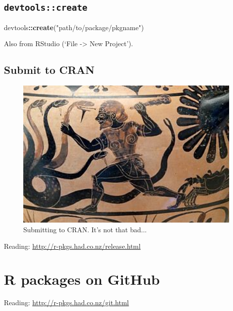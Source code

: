 \documentclass[]{book}
\newenvironment{Shaded}{\begin{snugshade}}{\end{snugshade}}
\newcommand{\KeywordTok}[1]{\textcolor[rgb]{0.13,0.29,0.53}{\textbf{#1}}}
\newcommand{\StringTok}[1]{\textcolor[rgb]{0.31,0.60,0.02}{#1}}
\newcommand{\OperatorTok}[1]{\textcolor[rgb]{0.81,0.36,0.00}{\textbf{#1}}}
\newcommand{\NormalTok}[1]{#1}
\theoremstyle{definition}
\theoremstyle{definition}
\theoremstyle{definition}
\theoremstyle{remark}
\begin{document}
\subsection{\texorpdfstring{\texttt{devtools::create}}{devtools::create}}\label{devtoolscreate}

\begin{Shaded}
\begin{Highlighting}[]
\NormalTok{devtools}\OperatorTok{::}\KeywordTok{create}\NormalTok{(}\StringTok{"path/to/package/pkgname"}\NormalTok{)}
\end{Highlighting}
\end{Shaded}

Also from RStudio (`File -\textgreater{} New Project').

\subsection{Submit to CRAN}\label{submit-to-cran}

\begin{figure}

{\centering \includegraphics[width=4.44in]{images/ch3_hydra} 

}

\caption{Submitting to CRAN.  It's not that bad...}\label{fig:hydra}
\end{figure}

Reading: \url{http://r-pkgs.had.co.nz/release.html}

\section{R packages on GitHub}\label{r-packages-on-github}

Reading: \url{http://r-pkgs.had.co.nz/git.html}
\end{document}
